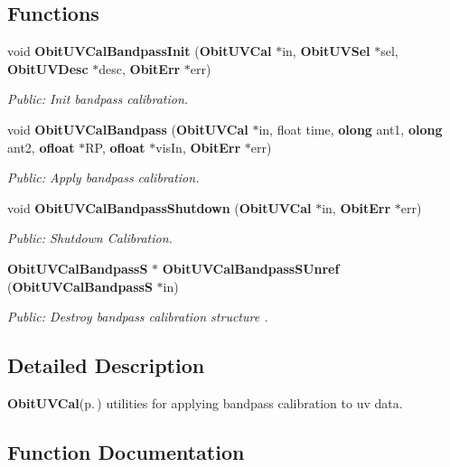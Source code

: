 \subsection*{Functions}
\begin{CompactItemize}
\item 
void {\bf Obit\-UVCal\-Bandpass\-Init} ({\bf Obit\-UVCal} $\ast$in, {\bf Obit\-UVSel} $\ast$sel, {\bf Obit\-UVDesc} $\ast$desc, {\bf Obit\-Err} $\ast$err)
\begin{CompactList}\small\item\em Public: Init bandpass calibration. \item\end{CompactList}\item 
void {\bf Obit\-UVCal\-Bandpass} ({\bf Obit\-UVCal} $\ast$in, float time, {\bf olong} ant1, {\bf olong} ant2, {\bf ofloat} $\ast$RP, {\bf ofloat} $\ast$vis\-In, {\bf Obit\-Err} $\ast$err)
\begin{CompactList}\small\item\em Public: Apply bandpass calibration. \item\end{CompactList}\item 
void {\bf Obit\-UVCal\-Bandpass\-Shutdown} ({\bf Obit\-UVCal} $\ast$in, {\bf Obit\-Err} $\ast$err)
\begin{CompactList}\small\item\em Public: Shutdown Calibration. \item\end{CompactList}\item 
{\bf Obit\-UVCal\-Bandpass\-S} $\ast$ {\bf Obit\-UVCal\-Bandpass\-SUnref} ({\bf Obit\-UVCal\-Bandpass\-S} $\ast$in)
\begin{CompactList}\small\item\em Public: Destroy bandpass calibration structure . \item\end{CompactList}\end{CompactItemize}


\subsection{Detailed Description}
{\bf Obit\-UVCal}{\rm (p.\,\pageref{structObitUVCal})} utilities for applying bandpass calibration to uv data. 



\subsection{Function Documentation}
